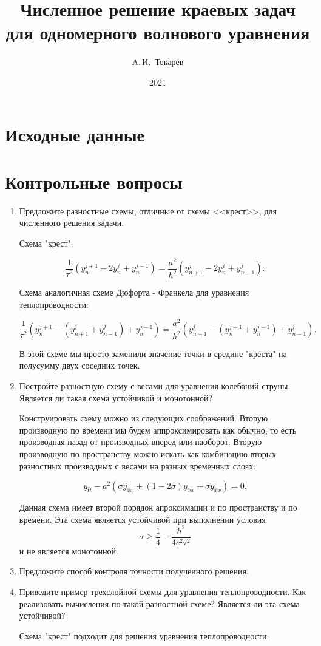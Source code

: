 \documentclass[12pt, a4paper]{article}
\title{Численное решение краевых задач для одномерного волнового уравнения}
\author{A.\,И.~Токарев}
\date{2021}
\begin{document}
\maketitle
\tableofcontents 
\newpage

\section{Исходные данные}

\newpage
\section{Контрольные вопросы}
\begin{enumerate}
\item Предложите разностные схемы, отличные от схемы <<крест>>,
для численного решения задачи.

Схема "крест":

\[
\dfrac{1}{\tau^2}(y_{n}^{j+1}- 2y_{n}^{j}+y_{n}^{j-1}) = \dfrac{a^2}{h^2}(y_{n+1}^{j}-2y_{n}^{j}+y_{n-1}^{j}).
\]

Схема аналогичная схеме Дюфорта - Франкела для уравнения теплопроводности: 

\[
\dfrac{1}{\tau^2}(y_{n}^{j+1}-(y_{n+1}^{j} + y_{n-1}^{j}) +y_{n}^{j-1}) = \dfrac{a^2}{h^2}(y_{n+1}^{j}-(y_{n}^{j+1} + y_{n}^{j-1})+y_{n-1}^{j}).
\]

В этой схеме мы просто заменили значение точки в средине "креста" на полусумму двух соседних точек. 


\item Постройте разностную схему с весами для уравнения колебаний струны. Является ли такая схема устойчивой и монотонной?

Конструировать схему можно из следующих соображений. Вторую производную по времени мы будем аппроксимировать как обычно, то есть производная назад от производных вперед или наоборот. Вторую производную по пространству можно искать как комбинацию вторых разностных производных с весами на разных временных слоях:

\[
y_{\bar{t}t} - a^2(\sigma \hat{y}_{\bar{x}x} + (1 - 2\sigma) y_{\bar{x}x} + \sigma  \check{y}_{\bar{x}x}) = 0.
\]

Данная схема имеет второй порядок апроксимации и по пространству и по времени. Эта схема является устойчивой при выполнении условия 
\[
\sigma \geqslant \dfrac{1}{4} - \dfrac{h^2}{4c^2\tau^2}
\]
и не является монотонной.

\item Предложите способ контроля точности полученного решения.

\item Приведите пример трехслойной схемы для уравнения теплопроводности. Как реализовать вычисления по такой разностной схеме? Является ли эта схема устойчивой?

Схема "крест" подходит для решения уравнения теплопроводности.


\end{enumerate}


\newpage
\end{document}
